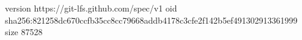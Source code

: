 version https://git-lfs.github.com/spec/v1
oid sha256:821258dc670ccfb35cc8cc79668addb4178c3cfe2f142b5ef491302913361999
size 87528
